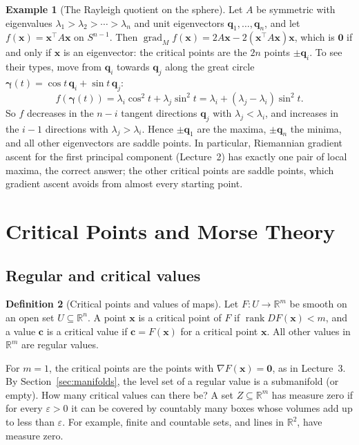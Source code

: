 \documentclass[11pt]{article}
\theoremstyle{definition}
\newtheorem{definition}{Definition}[section]
\newtheorem{example}[definition]{Example}
\theoremstyle{plain}
\theoremstyle{remark}
\DeclareMathOperator{\rank}{rank}
\DeclareMathOperator{\grad}{grad}
\begin{document}
\begin{example}[The Rayleigh quotient on the sphere]\label{ex:rayleigh-sphere}
    Let $A$ be symmetric with eigenvalues $\lambda_1 > \lambda_2 > \cdots > \lambda_n$ and unit eigenvectors $\mathbf{q}_1, \ldots, \mathbf{q}_n$, and let $f(\mathbf{x}) = \mathbf{x}^\top A\mathbf{x}$ on $S^{n-1}$. Then $\grad_M f(\mathbf{x}) = 2A\mathbf{x} - 2(\mathbf{x}^\top A\mathbf{x})\mathbf{x}$, which is $\mathbf{0}$ if and only if $\mathbf{x}$ is an eigenvector: the critical points are the $2n$ points $\pm\mathbf{q}_i$. To see their types, move from $\mathbf{q}_i$ towards $\mathbf{q}_j$ along the great circle $\boldsymbol{\gamma}(t) = \cos t\,\mathbf{q}_i + \sin t\,\mathbf{q}_j$:
    \[f(\boldsymbol{\gamma}(t)) = \lambda_i\cos^2 t + \lambda_j\sin^2 t = \lambda_i + (\lambda_j - \lambda_i)\sin^2 t.\]
    So $f$ decreases in the $n - i$ tangent directions $\mathbf{q}_j$ with $\lambda_j < \lambda_i$, and increases in the $i - 1$ directions with $\lambda_j > \lambda_i$. Hence $\pm\mathbf{q}_1$ are the maxima, $\pm\mathbf{q}_n$ the minima, and all other eigenvectors are saddle points. In particular, Riemannian gradient ascent for the first principal component (Lecture~2) has exactly one pair of local maxima, the correct answer; the other critical points are saddle points, which gradient ascent avoids from almost every starting point.
\end{example}

\section{Critical Points and Morse Theory}\label{sec:morse}

\subsection{Regular and critical values}

\begin{definition}[Critical points and values of maps]\label{def:critical-maps}
    Let $F: U \to \mathbb{R}^m$ be smooth on an open set $U \subseteq \mathbb{R}^n$. A point $\mathbf{x}$ is a critical point of $F$ if $\rank DF(\mathbf{x}) < m$, and a value $\mathbf{c}$ is a critical value if $\mathbf{c} = F(\mathbf{x})$ for a critical point $\mathbf{x}$. All other values in $\mathbb{R}^m$ are regular values.
\end{definition}

For $m = 1$, the critical points are the points with $\nabla F(\mathbf{x}) = \mathbf{0}$, as in Lecture~3. By Section~\ref{sec:manifolds}, the level set of a regular value is a submanifold (or empty). How many critical values can there be? A set $Z \subseteq \mathbb{R}^m$ has measure zero if for every $\varepsilon > 0$ it can be covered by countably many boxes whose volumes add up to less than $\varepsilon$. For example, finite and countable sets, and lines in $\mathbb{R}^2$, have measure zero.
\end{document}
